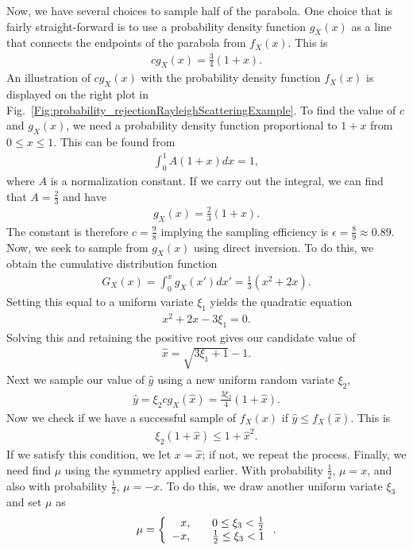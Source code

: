 Now, we have several choices to sample half of the parabola. One choice that is fairly straight-forward is to use a probability density function $g_X(x)$ as a line that connects the endpoints of the parabola from $f_X(x)$. This is
\begin{align}
  c g_X(x) = \frac{3}{4} ( 1 + x ) .
\end{align}
An illustration of $c g_X(x)$ with the probability density function $f_X(x)$ is displayed on the right plot in Fig.~\ref{Fig:probability_rejectionRayleighScatteringExample}. To find the value of $c$ and $g_X(x)$, we need a probability density function proportional to $1 + x$ from $0 \le x \le 1$. This can be found from
\begin{align}
  \int_0^1 A ( 1 + x ) dx = 1,
\end{align}
where $A$ is a normalization constant. If we carry out the integral, we can find that $A = \tfrac{2}{3}$ and have
\begin{align}
  g_X(x) = \frac{2}{3} ( 1 + x ) .
\end{align}
The constant is therefore $c = \tfrac{9}{8}$ implying the sampling efficiency is $\epsilon = \tfrac{8}{9} \approx 0.89$. Now, we seek to sample from $g_X(x)$ using direct inversion. To do this, we obtain the cumulative distribution function
\begin{align}
  G_X(x) = \int_0^x g_X(x') dx' = \frac{1}{3} ( x^2 + 2 x ) .
\end{align}
Setting this equal to a uniform variate $\xi_1$ yields the quadratic equation
\begin{align}
  x^2 + 2 x - 3 \xi_1 = 0.
\end{align}
Solving this and retaining the positive root gives our candidate value of
\begin{align}
  \hat{x} = \sqrt{ 3 \xi_1 + 1 } - 1 .
\end{align}
Next we sample our value of $\hat{y}$ using a new uniform random variate $\xi_2$,
\begin{align}
  \hat{y} = \xi_2 c g_X(\hat{x}) =  \frac{3 \xi_2}{4} ( 1 + \hat{x} ) .
\end{align}
Now we check if we have a successful sample of $f_X(x)$ if $\hat{y} \le f_X(\hat{x})$. This is
\begin{align}
  \xi_2 ( 1 + \hat{x} ) \le  1 + \hat{x}^2.
\end{align}
If we satisfy this condition, we let $x = \hat{x}$; if not, we repeat the process. Finally, we need find $\mu$ using the symmetry applied earlier. With probability $\tfrac{1}{2}$, $\mu = x$, and also with probability $\tfrac{1}{2}$, $\mu = -x$. To do this, we draw another uniform variate $\xi_3$ and set $\mu$ as 
\begin{align}
  \mu = \left\{ \begin{array}{r l}
   x, & \quad 0 \le \xi_3 < \frac{1}{2} \\
  -x, & \quad \tfrac{1}{2} \le \xi_3 < 1 \\ \end{array} \right. .
\end{align}


